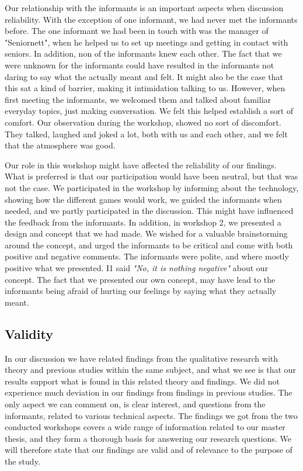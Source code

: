 Our relationship with the informants is an important aspects when discussion reliability. With the exception of one informant, we had never met the informants before. The one informant we had been in touch with was the manager of "Seniornett", when he helped us to set up meetings and getting in contact with seniors. In addition, non of the informants knew each other. The fact that we were unknown for the informants could have resulted in the informants not daring to say what the actually meant and felt. It might also be the case that this sat a kind of barrier, making it intimidation talking to us. However, when first meeting the informants, we welcomed them and talked about familiar everyday topics, just making conversation. We felt this helped establish a sort of comfort. Our observation during the workshop, showed no sort of discomfort. They talked, laughed and joked a lot, both with us and each other, and we felt that the atmosphere was good. 

Our role in this workshop might have affected the reliability of our findings. What is preferred is that our participation would have been neutral, but that was not the case. We participated in the workshop by informing about the technology, showing how the different games would work, we guided the informants when needed, and we partly participated in the discussion. This might have influenced the feedback from the informants. In addition, in workshop 2, we presented a design and concept that we had made. We wished for a valuable brainstorming around the concept, and urged the informants to be critical and come with both positive and negative comments. The informants were polite, and where mostly positive what we presented. I1 said \emph{"No, it is nothing negative"} about our concept. The fact that we presented our own concept, may have lead to the informants being afraid of hurting our feelings by saying what they actually meant. 


\subsection{Validity}

In our discussion we have related findings from the qualitative research with theory and previous studies within the same subject, and what we see is that our results support what is found in this related theory and findings. We did not experience much deviation in our findings from findings in previous studies. The only aspect we can comment on, is clear interest, and questions from the informants, related to various technical aspects. The findings we got from the two conducted workshops covers a wide range of information related to our master thesis, and they form a thorough basis for answering our research questions. We will therefore state that our findings are valid and of relevance to the purpose of the study. 

